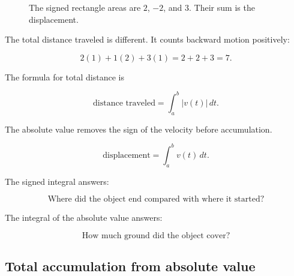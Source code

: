 \begin{figure}[h]
\centering
{}
\caption{The signed rectangle areas are \(2\), \(-2\), and \(3\).  Their sum is the displacement.}
\label{fig:piecewise-velocity-signed-area}
\end{figure}

The total distance traveled is different.  It counts backward motion positively:

\[
2(1)+1(2)+3(1)
=
2+2+3
=
7.
\]

The formula for total distance is

\[
\boxed{
\text{distance traveled}
=
\int_a^b |v(t)|\,dt.
}
\]

The absolute value removes the sign of the velocity before accumulation.

\[
\boxed{
\text{displacement}
=
\int_a^b v(t)\,dt.
}
\]

The signed integral answers:

\[
\text{Where did the object end compared with where it started?}
\]

The integral of the absolute value answers:

\[
\text{How much ground did the object cover?}
\]

\subsection{Total accumulation from absolute value}
\label{subsec:total-accumulation-absolute-value}

